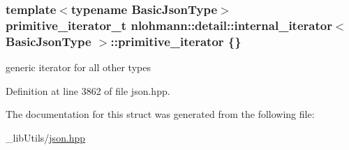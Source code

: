 \subsubsection[{\texorpdfstring{primitive\+\_\+iterator}{primitive_iterator}}]{\setlength{\rightskip}{0pt plus 5cm}template$<$typename Basic\+Json\+Type$>$ {\bf primitive\+\_\+iterator\+\_\+t} {\bf nlohmann\+::detail\+::internal\+\_\+iterator}$<$ Basic\+Json\+Type $>$\+::primitive\+\_\+iterator \{\}}\hypertarget{structnlohmann_1_1detail_1_1internal__iterator_a2b3bb45f968210e42c282017eeeb63a8}{}\label{structnlohmann_1_1detail_1_1internal__iterator_a2b3bb45f968210e42c282017eeeb63a8}


generic iterator for all other types 



Definition at line 3862 of file json.\+hpp.



The documentation for this struct was generated from the following file\+:\begin{DoxyCompactItemize}
\item 
\+\_\+lib\+Utils/\hyperlink{json_8hpp}{json.\+hpp}\end{DoxyCompactItemize}
